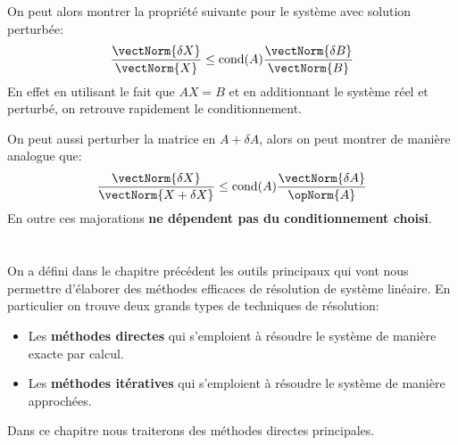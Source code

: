 \subsection*{}
On peut alors montrer la propriété suivante pour le système avec solution perturbée:
\[
   \frac{\vectNorm{\delta X}}{\vectNorm{X}} \leq  \text{cond}(A)\frac{\vectNorm{\delta B}}{\vectNorm{B}}
\]
En effet en utilisant le fait que \(AX = B\) et en additionnant le système réel et perturbé, on retrouve rapidement le conditionnement.\<

On peut aussi perturber la matrice en \(A + \delta A\), alors on peut montrer de manière analogue que:
\[
   \frac{\vectNorm{\delta X}}{\vectNorm{X +\delta X}} \leq  \text{cond}(A)\frac{\vectNorm{\delta A}}{\opNorm{A}}
\]
En outre ces majorations \textbf{ne dépendent pas du conditionnement choisi}.

\chapter*{}
On a défini dans le chapitre précédent les outils principaux qui vont nous permettre d'élaborer des méthodes efficaces de résolution de système linéaire. En particulier on trouve deux grands types de techniques de résolution:
\begin{itemize}
   \item Les \textbf{méthodes directes} qui s'emploient à résoudre le système de manière exacte par calcul.
   \item Les \textbf{méthodes itératives} qui s'emploient à résoudre le système de manière approchées.
\end{itemize}
Dans ce chapitre nous traiterons des méthodes directes principales.
\subsection*{}

\subsection*{}
\subsection*{}

